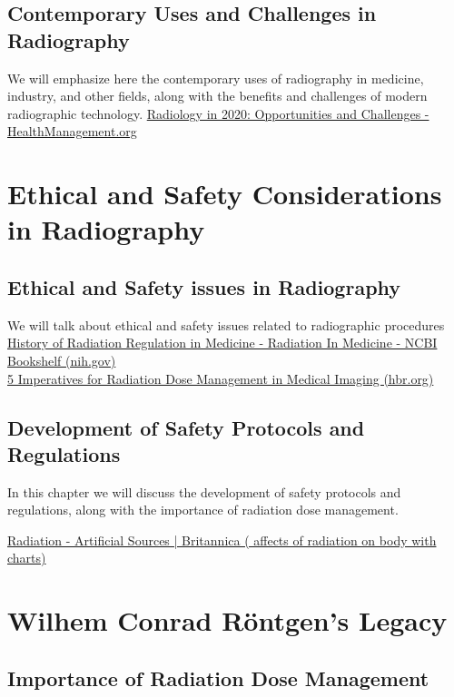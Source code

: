 \documentclass[a4paper,12pt]{report}
\begin{document}
\section{Contemporary Uses and Challenges in Radiography}
We will emphasize here the contemporary uses of radiography in medicine, industry, and other fields, along with the benefits and challenges of modern radiographic technology.
\href{https://healthmanagement.org/c/healthmanagement/issuearticle/radiology-in-2020-opportunities-and-challenges#:~:text=%E2%80%A2%20Radiological%20technology%20is%20shifting%20from%20a%20%E2%80%9Cdisruptive%E2%80%9D,In%20vitro%20diagnostics%20will%20change%20radiological%20screening%20policy.}{Radiology in 2020: Opportunities and Challenges - HealthManagement.org }


\chapter{Ethical and Safety Considerations in Radiography}

\section{Ethical and Safety issues in Radiography}
We will talk about ethical and safety issues related to radiographic procedures\\
\href{https://www.ncbi.nlm.nih.gov/books/NBK232703/}{History of Radiation Regulation in Medicine - Radiation In Medicine - NCBI Bookshelf (nih.gov)}\\
\href{https://hbr.org/sponsored/2022/10/5-imperatives-for-radiation-dose-management-in-medical-imaging}{5 Imperatives for Radiation Dose Management in Medical Imaging  (hbr.org)}
\section{Development of Safety Protocols and Regulations}
In this chapter we will discuss the development of safety protocols and regulations, along with the importance of radiation dose management.

\href{https://www.britannica.com/science/radiation/Artificial-sources}{Radiation - Artificial Sources | Britannica ( affects of radiation on body with charts)}

\chapter{Wilhem Conrad Röntgen's Legacy}
\section{Importance of Radiation Dose Management}
\end{document}
